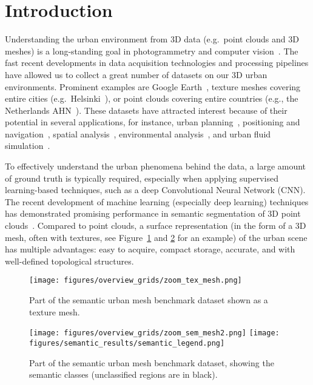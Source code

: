 \section{Introduction}%
\label{sec:intro}

Understanding the urban environment from 3D data (e.g.\ point clouds and 3D meshes) is a long-standing goal in photogrammetry and computer vision~\citep{matrone2020heritage, hackel2017semantic3d}. 
The fast recent developments in data acquisition technologies and processing pipelines have allowed us to collect a great number of datasets on our 3D urban environments. 
Prominent examples are Google Earth~\citep{Google3d}, texture meshes covering entire cities (e.g.\ Helsinki~\citep{Helsinki3d}), or point clouds covering entire countries (e.g., the Netherlands AHN~\citep{ahn2019}). 
These datasets have attracted interest because of their potential in several applications, for instance, urban planning~\citep{Chen2011,czynska2014application}, positioning and navigation~\citep{cappelle2012virtual,Peyraud2013,Hsu2015}, spatial analysis~\citep{Yaagoubi2015}, environmental analysis~\citep{Deng2016}, and urban fluid simulation~\citep{GarciaSanchez14}. 

To effectively understand the urban phenomena behind the data, a large amount of ground truth is typically required, especially when applying supervised learning-based techniques, such as a deep Convolutional Neural Network (CNN). 
The recent development of machine learning (especially deep learning) techniques has demonstrated promising performance in semantic segmentation of 3D point clouds~\citep{qi2017pointnet,landrieu2018large, thomas2019kpconv}. 
Compared to point clouds, a surface representation (in the form of a 3D mesh, often with textures, see Figure~\ref{fig:texside} and \ref{fig:semside} for an example) of the urban scene has multiple advantages: easy to acquire, compact storage, accurate, and with well-defined topological structures.

\begin{figure}[H]
	\texttt{[image: figures/overview\_grids/zoom\_tex\_mesh.png]} 
	\caption{Part of the semantic urban mesh benchmark dataset shown as a texture mesh.}
	\label{fig:texside}
\end{figure}

\begin{figure}[H]
	\texttt{[image: figures/overview\_grids/zoom\_sem\_mesh2.png]} 
	\centering
	\texttt{[image: figures/semantic\_results/semantic\_legend.png]}
	\caption{Part of the semantic urban mesh benchmark dataset, showing the semantic classes (unclassified regions are in black). }
	\label{fig:semside}
\end{figure}

